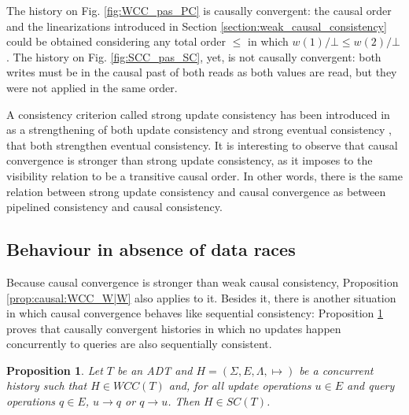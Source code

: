 \documentclass[9pt,numbers]{sigplanconf}
\newtheorem{proposition}{Proposition}
\begin{document}
\pagebreak 
The history on Fig. \ref{fig:WCC_pas_PC} is causally convergent: the causal order and the
linearizations introduced in Section \ref{section:weak_causal_consistency} could be obtained considering any total
order $\le$ in which \linebreak $w(1)/\bot \le w(2)/\bot$. The history on Fig. \ref{fig:SCC_pas_SC}, yet, 
is not causally convergent: both writes must be in the causal past of both
reads as both values are read, but they were not applied in the same order.

A consistency criterion called strong update consistency has been
introduced in \cite{perrin2015update} as a strengthening of both update
consistency and strong eventual consistency \cite{BGYZ14},
that both strengthen eventual consistency. It is interesting to observe that 
causal convergence is stronger than strong update consistency, as it 
imposes to the visibility relation to be a transitive causal order. In 
other words, there is the same relation between strong update 
consistency and causal convergence as between pipelined consistency and 
causal consistency.


\subsection{Behaviour in absence of data races}

Because causal convergence is stronger than weak causal consistency, Proposition \ref{prop:causal:WCC_W|W} also applies to it. 
Besides it, there is another situation in which causal convergence behaves like sequential consistency: Proposition \ref{prop:causal:CCv_W|R}
proves that causally convergent histories in which no updates happen concurrently to queries are also sequentially consistent. 

\begin{proposition}\label{prop:causal:CCv_W|R}
  Let $T$ be an ADT and $H = (\Sigma, E, \Lambda, \mapsto)$ be a concurrent history such that $H \in WCC(T)$ and, 
  for all update operations $u \in E$
  and query operations $q \in E$, $u\rightarrow q$ or $q\rightarrow u$. Then $H\in SC(T)$.
\end{proposition}
\end{document}
